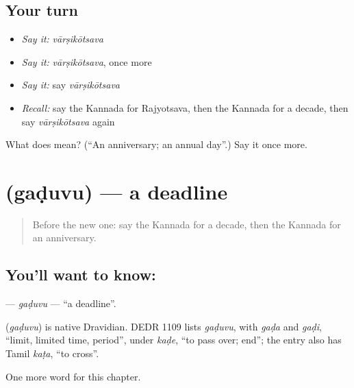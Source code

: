 \subsection*{Your turn}
\begin{itemize}
\raggedright
  \item \emph{Say it:} \emph{vārṣikōtsava}
  \item \emph{Say it:} \emph{vārṣikōtsava}, once more
  \item \emph{Say it:} say \emph{vārṣikōtsava}
  \item \emph{Recall:} say the Kannada for Rajyotsava, then the Kannada for a decade, then say \emph{vārṣikōtsava} again
\end{itemize}

\begin{tcolorbox}[breakable,colback=teal!4,colframe=teal!35!black,title={Before you move on}]
What does  mean? (\textquotedblleft{}An anniversary; an annual day\textquotedblright{}.) Say it once more.
\end{tcolorbox}
\section[\texorpdfstring{\kn{ಗಡುವು} (gaḍuvu)}{ಗಡುವು (gaḍuvu)}]{ (gaḍuvu) — a deadline}

\label{lesson:KA-C248-gaduvu}



\begin{quote}
Before the new one: say the Kannada for a decade, then the Kannada for an anniversary.
\end{quote}

\subsection*{You'll want to know: }
\textbf{} — \emph{gaḍuvu} — \textquotedblleft{}a deadline\textquotedblright{}.

\begin{cousinweb}
\textbf{} (\emph{gaḍuvu}) is native Dravidian. DEDR 1109 lists \emph{gaḍuvu}, with \emph{gaḍa} and \emph{gaḍi}, \textquotedblleft{}limit, limited time, period\textquotedblright{}, under \emph{kaḍe}, \textquotedblleft{}to pass over; end\textquotedblright{}; the entry also has Tamil \emph{kaṭa}, \textquotedblleft{}to cross\textquotedblright{}.
\end{cousinweb}

\begin{grammarlens}[title={What you've built}]
One more word for this chapter.
\end{grammarlens}

